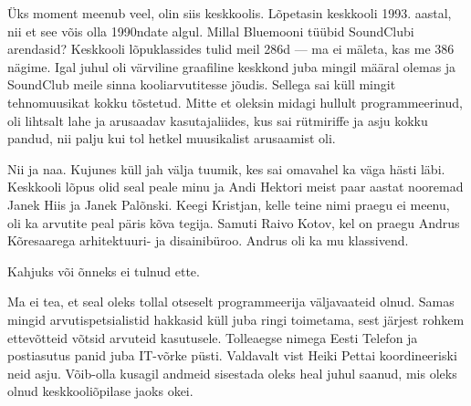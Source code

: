 Üks moment meenub veel, olin siis keskkoolis. 
Lõpetasin keskkooli 1993. aastal, nii et see võis olla 1990ndate algul. Millal 
Bluemooni tüübid SoundClubi arendasid? Keskkooli lõpuklassides 
tulid meil 286d --- ma ei mäleta, kas me 386 nägime. 
Igal juhul oli värviline graafiline keskkond juba mingil määral olemas ja 
SoundClub meile sinna kooliarvutitesse jõudis. Sellega sai küll mingit 
tehnomuusikat kokku tõstetud. Mitte et oleksin midagi hullult programmeerinud, oli lihtsalt lahe ja arusaadav kasutajaliides, kus sai
rütmiriffe ja asju kokku pandud, nii palju kui tol hetkel 
muusikalist arusaamist oli.


Nii ja naa. Kujunes küll jah välja tuumik, kes sai omavahel ka väga 
hästi läbi. Keskkooli lõpus olid seal peale 
minu ja Andi Hektori meist paar aastat 
nooremad Janek Hiis ja Janek 
Palõnski. Keegi Kristjan, kelle teine 
nimi praegu ei meenu, oli ka arvutite peal päris kõva tegija. Samuti Raivo 
Kotov, kel on praegu Andrus 
Kõresaarega arhitektuuri- ja 
disainibüroo. Andrus oli ka mu klassivend.


Kahjuks või õnneks ei tulnud ette. 


Ma ei tea, et seal oleks tollal otseselt programmeerija väljavaateid 
olnud. Samas mingid arvutispetsialistid hakkasid küll juba ringi 
toimetama, sest järjest rohkem ettevõtteid võtsid arvuteid kasutusele. Tolleaegse nimega 
Eesti Telefon ja postiasutus panid juba IT-võrke püsti. Valdavalt vist Heiki 
Pettai koordineeriski neid asju. Võib-olla kusagil andmeid sisestada oleks 
heal juhul saanud, mis oleks olnud keskkooliõpilase jaoks okei. 

